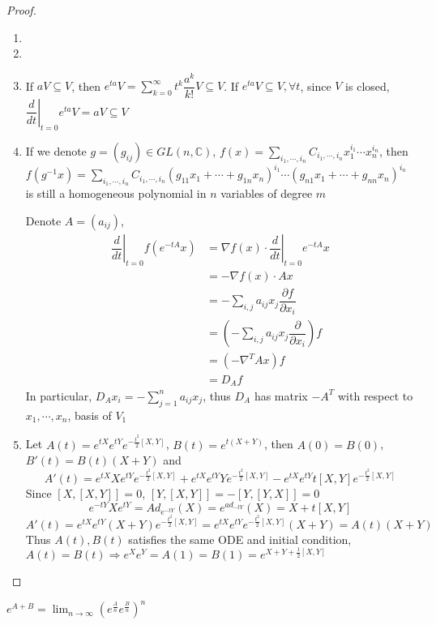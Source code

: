 \documentclass[main]{subfiles}
\begin{document}
\begin{proof}
\begin{enumerate}
\item 
\item 
\item If $aV\subseteq V$, then $e^{ta}V=\displaystyle\sum_{k=0}^\infty t^k\dfrac{a^k}{k!}V\subseteq V$. If $e^{ta}V\subseteq V,\forall t$, since $V$ is closed, $\left.\dfrac{d}{dt}\right|_{t=0}e^{ta}V=aV\subseteq V$
\item If we denote $g=(g_{ij})\in GL(n,\mathbb C)$, $f(x)=\displaystyle\sum_{i_1,\cdots,i_n}C_{i_1,\cdots,i_n}x_1^{i_1}\cdots x_n^{i_n}$, then $f(g^{-1}x)=\displaystyle\sum_{i_1,\cdots,i_n}C_{i_1,\cdots,i_n}(g_{11}x_1+\cdots+g_{1n}x_n)^{i_1}\cdots (g_{n1}x_1+\cdots+g_{nn}x_n)^{i_n}$ is still a homogeneous polynomial in $n$ variables of degree $m$ \par
Denote $A=(a_{ij})$, \begin{align*}
\left.\dfrac{d}{dt}\right|_{t=0}f(e^{-tA}x)&=\displaystyle\nabla f(x)\cdot\left.\dfrac{d}{dt}\right|_{t=0}e^{-tA}x \\
&=-\nabla f(x)\cdot Ax \\
&=-\sum_{i,j}a_{ij}x_j\dfrac{\partial f}{\partial x_i} \\
&=\left(-\sum_{i,j}a_{ij}x_j\dfrac{\partial }{\partial x_i}\right) f \\
&=(-\nabla^TAx)f \\
&=D_A f
\end{align*}
In particular, $\displaystyle D_Ax_i=-\sum_{j=1}^na_{ij}x_j$, thus $D_A$ has matrix $-A^T$ with respect to $x_1,\cdots,x_n$, basis of $V_1$
\item Let $A(t)=e^{tX}e^{tY}e^{-\frac{t^2}{2}[X,Y]}$, $B(t)=e^{t(X+Y)}$, then $A(0)=B(0)$, $B'(t)=B(t)(X+Y)$ and
\[A'(t)=e^{tX}Xe^{tY}e^{-\frac{t^2}{2}[X,Y]}+e^{tX}e^{tY}Ye^{-\frac{t^2}{2}[X,Y]}-e^{tX}e^{tY}t[X,Y]e^{-\frac{t^2}{2}[X,Y]}\]
Since $[X,[X,Y]]=0$, $[Y,[X,Y]]=-[Y,[Y,X]]=0$
\[e^{-tY}Xe^{tY}=Ad_{e^{-tY}}(X)=e^{ad_{-tY}}(X)=X+t[X,Y]\]
\[A'(t)=e^{tX}e^{tY}(X+Y)e^{-\frac{t^2}{2}[X,Y]}=e^{tX}e^{tY}e^{-\frac{t^2}{2}[X,Y]}(X+Y)=A(t)(X+Y)\]
Thus $A(t),B(t)$ satisfies the same ODE and initial condition, $A(t)=B(t)\Rightarrow e^Xe^Y=A(1)=B(1)=e^{X+Y+\frac{1}{2}[X,Y]}$
\end{enumerate}
\end{proof}

\begin{theorem}\label{Lie product formula}
$\displaystyle e^{A+B}=\lim_{n\to\infty}\left(e^\frac{A}{n}e^\frac{B}{n}\right)^n$
\end{theorem}
\end{document}
